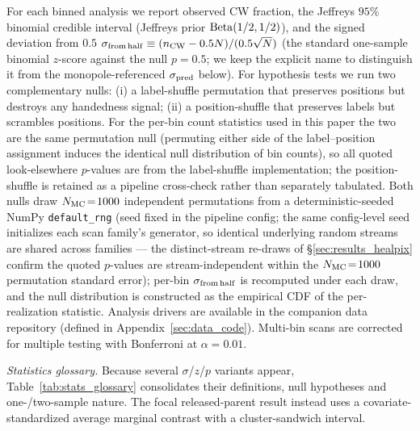\documentclass[aps,prd,twocolumn,superscriptaddress,showpacs,preprintnumbers,nofootinbib,longbibliography,floatfix]{revtex4-2}
\begin{document}
For each binned analysis we report observed CW fraction, the Jeffreys
$95\%$ binomial credible interval (Jeffreys prior
${\rm Beta}(1/2,1/2)$), and the signed deviation from $0.5$
$\sigma_{\rm from\,half} \equiv (n_{\rm CW} - 0.5 N)/(0.5\sqrt{N})$
(the standard one-sample binomial $z$-score against the null
$p = 0.5$; we keep the explicit name to distinguish it from the
monopole-referenced $\sigma_{\rm pred}$ below).
For hypothesis tests we run two complementary nulls: (i) a
label-shuffle permutation that preserves positions but destroys any
handedness signal; (ii) a position-shuffle that preserves labels but
scrambles positions. For the per-bin count statistics used in this
paper the two are the same permutation null (permuting either side of
the label--position assignment induces the identical null
distribution of bin counts), so all quoted look-elsewhere $p$-values
are from the label-shuffle implementation; the position-shuffle is
retained as a pipeline cross-check rather than separately tabulated. Both nulls draw $N_{\rm MC}\!=\!1000$
independent permutations from a deterministic-seeded NumPy
\texttt{default\_rng} (seed fixed in the pipeline config; the same
config-level seed initializes each scan family's generator, so
identical underlying random streams are shared across families ---
the distinct-stream re-draws of \S\ref{sec:results_healpix} confirm
the quoted $p$-values are stream-independent within the
$N_{\rm MC}\!=\!1000$ permutation standard error); per-bin
$\sigma_{\rm from\,half}$ is recomputed under each draw, and the
null distribution is constructed as the empirical CDF of the
per-realization statistic. Analysis drivers are available in the
companion data repository (defined in
Appendix~\ref{sec:data_code}). Multi-bin scans are
corrected for multiple testing with Bonferroni at $\alpha\!=\!0.01$.

\emph{Statistics glossary.} Because several $\sigma$/$z$/$p$ variants
appear, Table~\ref{tab:stats_glossary} consolidates their definitions,
null hypotheses and one-/two-sample nature. The focal
released-parent result instead uses a covariate-standardized average
marginal contrast with a cluster-sandwich interval.
\end{document}
